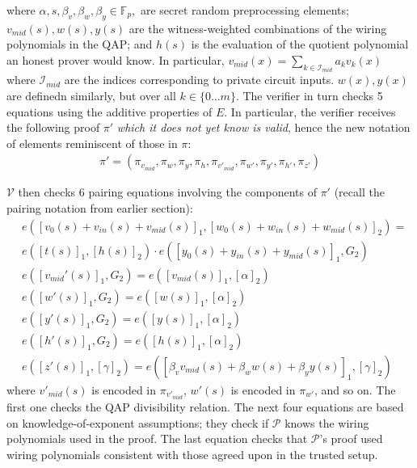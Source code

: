 where $\alpha, s, \beta_v, \beta_w, \beta_y \in \mathbb{F}_p, $ are secret random preprocessing elements; $v_{mid}(s), w(s), y(s)$ are the witness-weighted combinations of the wiring polynomials in the QAP; and $h(s)$ is the evaluation of the quotient polynomial an honest prover would know. In particular, $v_{mid}(x) = \sum_{k \in \mathcal{I}_{mid}} a_k v_k(x)$ where $\mathcal{I}_{mid}$ are the indices corresponding to private circuit inputs. $w(x), y(x)$ are definedn similarly, but over all $k \in \{0 \dots m\}$. The verifier in turn checks 5 equations using the additive properties of $E$. In particular, the verifier receives the following proof $\pi'$ \textit{which it does not yet know is valid}, hence the new notation of elements reminiscent of those in $\pi$:
\begin{align}
\pi' = (\pi_{v_{mid}}, \pi_{w}, \pi_{y}, \pi_{h}, \pi_{v'_{mid}}, \pi_{w'}, \pi_{y'}, \pi_{h'}, \pi_{z'})
\end{align}

\noindent $\mathcal{V}$ then checks 6 pairing equations involving the components of $\pi'$ (recall the pairing notation from earlier section):  
\begin{align}
&e([v_0(s) + v_{in}(s) + v_{mid}(s)]_1, [w_0(s) + w_{in}(s) + w_{mid}(s)]_2) = \\ 
&e([t(s)]_1, [h(s)]_2) \cdot e([y_0(s) + y_{in}(s) + y_{mid}(s)]_1, G_2) \\
&e([v_{mid}'(s)]_1, G_2) = e([v_{mid}(s)]_1, [\alpha]_2) \\
&e([w'(s)]_1, G_2) = e([w(s)]_1, [\alpha]_2) \\
&e([y'(s)]_1, G_2) = e([y(s)]_1, [\alpha]_2) \\
&e([h'(s)]_1, G_2) = e([h(s)]_1, [\alpha]_2) \\
&e([z'(s)]_1, [\gamma]_2) = e([\beta_v v_{mid}(s) + \beta_w w(s) + \beta_y y(s)]_1, [\gamma]_2)
\end{align}
\noindent where $v'_{mid}(s)$ is encoded in $\pi_{v'_{mid}}$, $w'(s)$ is encoded in $\pi_{w'}$, and so on. The first one checks the QAP divisibility relation. The next four equations are based on knowledge-of-exponent assumptions; they check if $\mathcal{P}$ knows the wiring polynomials used in the proof. The last equation checks that $\mathcal{P}$'s proof used wiring polynomials consistent with those agreed upon in the trusted setup. \\

